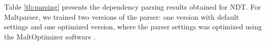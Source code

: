 \documentclass[11pt,a4paper]{article}
\begin{document}
Table \ref{tb:parsing} presents the dependency parsing results
obtained for NDT.  For Maltparser, we trained two versions of the
parser: one version with default settings and one optimized version,
where the parser settings was optimized using the MaltOptimizer
software .


\clearpage

\end{document}
